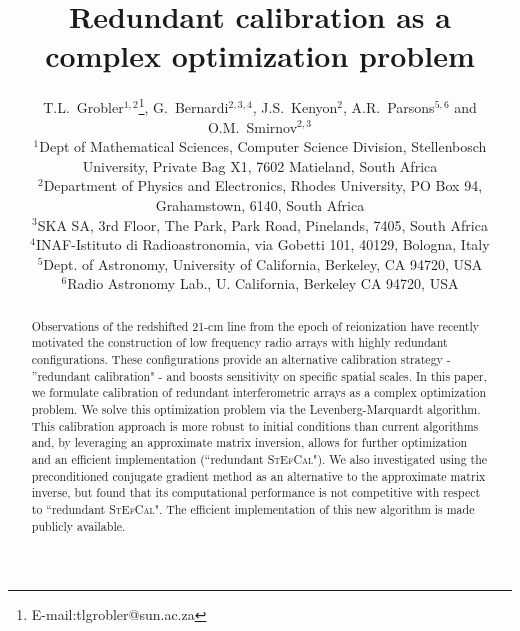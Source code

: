 \documentclass[useAMS,usenatbib]{mn2e}
\title[Redundant interferometric calibration as a complex optimization problem]{Redundant calibration as a complex optimization problem}
\author[T.L.~Grobler et al.]{T.L.~Grobler$^{1,2}$\thanks{E-mail:tlgrobler@sun.ac.za}, G.~Bernardi$^{2,3,4}$, J.S.~Kenyon$^{2}$, A.R.~Parsons$^{5,6}$ and O.M.~Smirnov$^{2,3}$\\
$^{1}$Dept of Mathematical Sciences, Computer Science Division, Stellenbosch University, Private Bag X1, 7602 Matieland, South Africa\\
$^{2}$Department of Physics and Electronics, Rhodes University, PO Box 94, Grahamstown, 6140, South Africa\\
$^{3}$SKA SA, 3rd Floor, The Park, Park Road, Pinelands, 7405, South Africa\\
$^{4}$INAF-Istituto di Radioastronomia, via Gobetti 101, 40129, Bologna, Italy\\
$^{5}$Dept. of Astronomy, University of California, Berkeley, CA 94720, USA\\
$^{6}$Radio Astronomy Lab., U. California, Berkeley CA 94720, USA}
\begin{document}

\pagerange{\pageref{firstpage}--\pageref{lastpage}} 

\maketitle

\label{firstpage}

\begin{abstract}
Observations of the redshifted 21-cm line from the epoch of reionization have recently motivated the construction of low 
frequency radio arrays with highly redundant configurations. These configurations provide an alternative calibration strategy - 
''redundant calibration" - and boosts sensitivity on specific spatial scales. In this paper, we formulate 
calibration of redundant interferometric arrays as a complex optimization problem. 
We solve this optimization problem via the Levenberg-Marquardt algorithm. This calibration approach is more 
robust to initial conditions than current algorithms and, by leveraging an approximate matrix inversion, allows for further optimization and an efficient implementation (``redundant \textsc{StEfCal}"). We also investigated using the preconditioned conjugate gradient method as an alternative to the approximate matrix inverse, but found that its computational performance is not competitive with respect to ``redundant \textsc{StEfCal}". The efficient implementation of this new algorithm is made publicly available.

\end{abstract}
\end{document}

